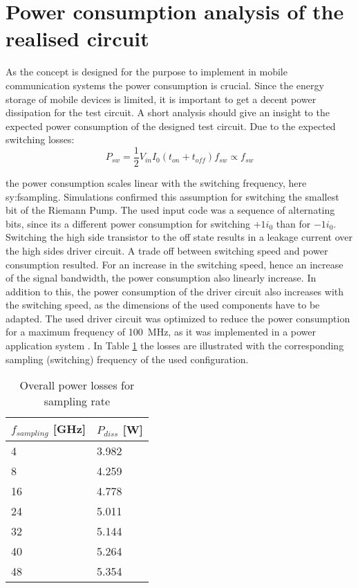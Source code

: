\section{Power consumption analysis of the realised circuit}
As the concept is designed for the purpose to implement in mobile communication systems the power consumption is crucial.
Since the energy storage of mobile devices is limited, it is important to get a decent power dissipation for the test circuit.
A short analysis should give an insight to the expected power consumption of the designed test circuit.
Due to the expected switching losses:
\begin{equation}
 P_{sw} = \frac{1}{2} V_{in}I_0(t_{on}+t_{off})f_{sw} \propto f_{sw}
 \label{eq:swtichloss}
\end{equation}

the power consumption scales linear with the switching frequency, here \gls{sy:fsampling}.
Simulations confirmed this assumption for switching the smallest bit of the Riemann Pump.
The used input code was a sequence of alternating bits, since its a different power consumption for switching $+1 i_0$ than for $-1 i_0$.
Switching the high side transistor to the off state results in a leakage current over the high sides driver circuit.
A trade off between switching speed and power consumption resulted.
For an increase in the switching speed, hence an increase of the signal bandwidth, the power consumption also linearly increase.
In addition to this, the power consumption of the driver circuit also increases with the switching speed, as the dimensions of the used components have to be adapted.
The used driver circuit was optimized to reduce the power consumption for a maximum frequency of \SI{100}{\mega \hertz}, as it was implemented in a power application system \cite{MaksimovicPaper}.
In Table \ref{tab:switchloss} the losses are illustrated with the corresponding sampling (switching) frequency of the used configuration.

\begin{table}[ht]
\centering
\begin{tabular}{|l|l|}
\hline
$f_{sampling}$ {[}GHz{]} & $P_{diss}$ {[}W{]} \\ \hline
4                    & 3.982              \\ \hline
8                    & 4.259              \\ \hline
16                   & 4.778              \\ \hline
24                   & 5.011              \\ \hline
32                   & 5.144              \\ \hline
40                   & 5.264              \\ \hline
48                   & 5.354              \\ \hline
\end{tabular}
\caption{Overall power losses for sampling rate}
\label{tab:switchloss}
\end{table}

